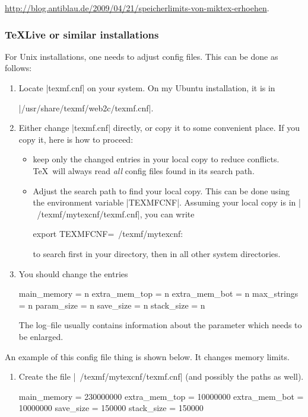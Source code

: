 {\url{http://blog.antiblau.de/2009/04/21/speicherlimits-von-miktex-erhoehen}.

\subsubsection{\TeX Live or similar installations}
For Unix installations, one needs to adjust config files. This can be done as follows:
\begin{enumerate}
	\item Locate |texmf.cnf| on your system. On my Ubuntu installation, it is in 
	
	|/usr/share/texmf/web2c/texmf.cnf|.
	\item Either change |texmf.cnf| directly, or copy it to some convenient place. If you copy it, here is how to proceed:
		\begin{itemize}
			\item keep only the changed entries in your local copy to reduce conflicts. \TeX\ will always read \emph{all} config files found in its search path.
			\item Adjust the search path to find your local copy. This can be done using the environment variable |TEXMFCNF|. Assuming your local copy is in |~/texmf/mytexcnf/texmf.cnf|, you can write
\begin{codeexample}
export TEXMFCNF=~/texmf/mytexcnf:
\end{codeexample}
			to search first in your directory, then in all other system directories.
		\end{itemize}
	\item You should change the entries
\begin{codeexample}
main_memory = n
extra_mem_top = n
extra_mem_bot = n
max_strings = n
param_size = n
save_size = n
stack_size = n
\end{codeexample}
		The log--file usually contains information about the parameter which needs to be enlarged.
\end{enumerate}
An example of this config file thing is shown below. It changes memory limits.
\begin{enumerate}
	\item Create the file |~/texmf/mytexcnf/texmf.cnf| (and possibly the paths as well).
\begin{codeexample}
main_memory = 230000000 %
extra_mem_top = 10000000     %
extra_mem_bot = 10000000     %
save_size = 150000	%
stack_size = 150000	%


\end{codeexample}
\end{enumerate}}
